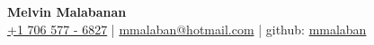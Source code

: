 \documentclass[11pt, letterpaper]{article}
\begin{document}
\begin{center}
    {\Large \textbf{Melvin Malabanan}} \\ [0.5em]
    \href{tel:+17065776827}{+1 706 577 - 6827} \quad | \quad
    \href{mailto:mmalaban@hotmailcom}{mmalaban@hotmail.com} \quad | \quad
    github: \href{https://github.com/mmalaban}{mmalaban}
\end{center}

\vspace{0.5em}
\end{document}
